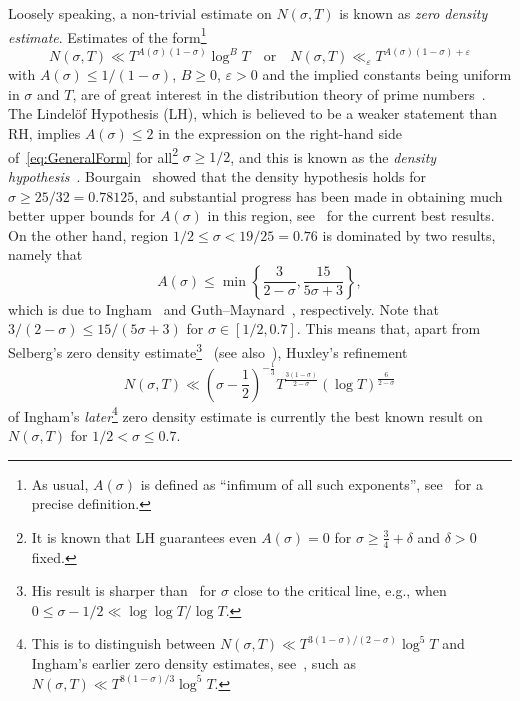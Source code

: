 \documentclass[a4paper,reqno]{amsart}
\theoremstyle{definition}
\begin{document}
Loosely speaking, a non-trivial estimate on $N(\sigma,T)$ is known as \emph{zero density estimate}. Estimates of the form\footnote{As usual, $A(\sigma)$ is defined as ``infimum of all such exponents'', see~\cite[Definition~37]{TaoTrudgianYang} for a precise definition.} 
\begin{equation}
\label{eq:GeneralForm}
N(\sigma,T)\ll T^{A(\sigma)(1-\sigma)}\log^{B}{T}\quad \textrm{or} \quad N(\sigma,T)\ll_{\varepsilon}T^{A(\sigma)(1-\sigma)+\varepsilon} 
\end{equation}
with $A(\sigma)\leq1/(1-\sigma)$, $B\geq0$, $\varepsilon>0$ and the implied constants being uniform in $\sigma$ and $T$, are of great interest in the distribution theory of prime numbers~\cite{Ivic,StarichkovaZD}. The Lindel\"{o}f Hypothesis (LH), which is believed to be a weaker statement than RH, implies $A(\sigma)\leq 2$ in the expression on the right-hand side of~\eqref{eq:GeneralForm} for all\footnote{It is known that LH guarantees even $A(\sigma)=0$ for $\sigma \geq \frac{3}{4}+\delta$ and $\delta>0$ fixed.} $\sigma\geq 1/2$, and this is known as the \emph{density hypothesis}~\cite[p.~47]{Ivic}. Bourgain~\cite{jean_bourgain_2000} showed that the density hypothesis holds for $\sigma\geq 25/32=0.78125$, and substantial progress has been made in obtaining much better upper bounds for $A(\sigma)$ in this region, see~\cite[Table 2 on p.~33]{TaoTrudgianYang} for the current best results. On the other hand, region $1/2\leq \sigma<19/25=0.76$ is dominated by two results, namely that
\begin{equation*}
A(\sigma)\leq \min\left\{\frac{3}{2-\sigma},\frac{15}{5\sigma+3}\right\},
\end{equation*}
which is due to Ingham~\cite{In40} and Guth--Maynard~\cite{guth2024new}, respectively. Note that $3/(2-\sigma)\leq 15/(5\sigma+3)$ for $\sigma\in[1/2,0.7]$. This means that, apart from Selberg's zero density estimate\footnote{His result is sharper than~\cite{In40} for $\sigma$ close to the critical line, e.g., when $0\leq\sigma-1/2\ll \log{\log{T}}/\log{T}$.}~\cite{Sel46} (see also~\cite{BaluyotPhD,SimonicEZDE}), Huxley's refinement~\cite[Chapter~23]{HuxleyBook}
\begin{equation}
\label{eq:Ingham2ndZD}
N(\sigma,T) \ll \left(\sigma-\frac{1}{2}\right)^{-\frac{1}{3}}T^{\frac{3(1-\sigma)}{2-\sigma}}\left(\log{T}\right)^{\frac{6}{2-\sigma}}
\end{equation}
of Ingham's \emph{later}\footnote{This is to distinguish between $N(\sigma,T)\ll T^{3(1-\sigma)/(2-\sigma)}\log^{5}{T}$ and Ingham's earlier zero density estimates, see~\cite{ingham1937difference}, such as $N(\sigma,T)\ll T^{8(1-\sigma)/3}\log^{5}{T}$.} zero density estimate is currently the best known result on $N(\sigma,T)$ for $1/2<\sigma\leq 0.7$.
\end{document}
